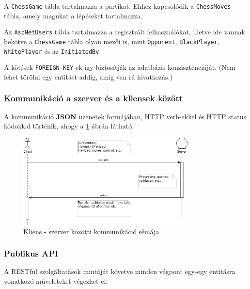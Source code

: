 \documentclass[twoside, a4paper, 12pt]{article}
\begin{document}
A \texttt{ChessGame} tábla tartalmazza a partikat. Ehhez kapcsolódik a \texttt{ChessMoves} tábla, amely magukat a lépéseket tartalmazza.

Az \texttt{AspNetUsers} tábla tartalmazza a regisztrált felhasználókat, illetve ide vannak bekötve a \texttt{ChessGame} tábla olyan mezői is, mint \texttt{Opponent}, \texttt{BlackPlayer}, \texttt{WhitePlayer} és az \texttt{InitiatedBy}.

A kötések \texttt{FOREIGN KEY}-ek így biztosítják az adatbázis konzisztenciáját. (Nem lehet törölni egy entitást addig, amíg van rá hivatkozás.)

\subsubsection{Kommunikáció a szerver és a kliensek között}
A kommunikáció \textbf{JSON} üzenetek formájában, HTTP verb-ekkel és HTTP status kódokkal történik, ahogy a \ref{fig:clientServerCommunication} ábrán látható.

\begin{figure}[htbp]
	\centering
	\includegraphics[width=0.8\textwidth]{img/clientServerCommunication.png}
	\caption{Kliens - szerver közötti kommunikáció sémája}
	\label{fig:clientServerCommunication}
\end{figure}

\subsubsection{Publikus API}
A RESTful szolgáltatások mintáját követve minden végpont egy-egy entitásra vonatkozó műveleteket végezhet el:
\end{document}
